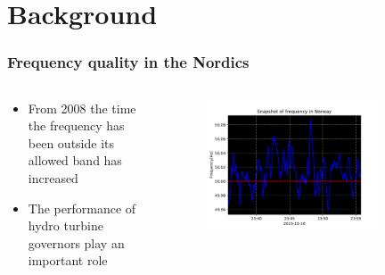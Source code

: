 \section{Background}
\begin{frame}
	\frametitle{Frequency quality in the Nordics}
	\begin{columns}
		\begin{column}{0.5\textwidth}
			\begin{itemize}
				\item From 2008 the time the frequency has been outside its allowed band has increased
				\item The performance of hydro turbine governors play an important role
			\end{itemize}
		\end{column}
		\begin{column}{0.5\textwidth}
			\begin{figure}
				\includegraphics[width=0.8\textwidth]{./pictures/frequency.pdf}
			\end{figure}
		\end{column}
	\end{columns}
\end{frame}
